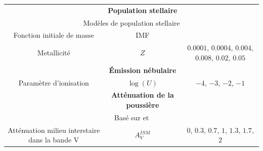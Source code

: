 \documentclass[../main/main.tex]{subfiles}
\begin{document}
\begin{table}[h]
{\begin{tabularx}{1.2\textwidth}{ccc}
                                                   & \textbf{Population stellaire} & \\
                               \multicolumn{3}{c}{Modèles de population stellaire
                                 \citet{BCO3}}\hspace{-1.1cm}\\
                               
                               
                               \hline
                               Fonction initiale de masse & IMF & \citet{Chabrier2003}\\
                               
          Metallicité & $Z$ & $0.0001$, $0.0004$, $0.004$, $0.008$,
                              $0.02$, $0.05$\\
                               
                               \hline                               

                                                   & \textbf{\'Emission
                                                     nébulaire} & \\
                               \hline
                               
                               Paramètre d'ionisation& $\log(U)$& $-4$, $-3$, $-2$, $-1$\\
                               
                               \hline
                                                   & \textbf{Atténuation
                                                     de la
                                                     poussière}&\\
                               \multicolumn{3}{c}{Basé sur
                               \citet{CharlotFall2000} et \citet{Buat2018}}\hspace{-1.1cm}\\
                               \hline
                               Atténuation milieu interstaire dans la
                               bande V & $A_{V}^{ISM}$&$0$, $0.3$,
                                                        $0.7$, $1$,
                                                        $1.3$, $1.7$,
                                                        $2$\\
                              

\end{tabularx}}
\end{table}
\end{document}
